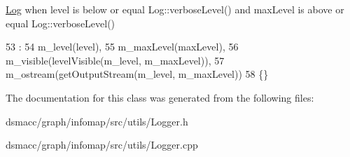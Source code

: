 \mbox{\hyperlink{classLog}{Log}} when level is below or equal Log\+::verbose\+Level() and max\+Level is above or equal Log\+::verbose\+Level() 
\begin{DoxyCode}
53                                                                                                        :
54         m\_level(level),
55         m\_maxLevel(maxLevel),
56         m\_visible(levelVisible(m\_level, m\_maxLevel)),
57         m\_ostream(getOutputStream(m\_level, m\_maxLevel))
58     \{\}
\end{DoxyCode}


The documentation for this class was generated from the following files\+:\begin{DoxyCompactItemize}
\item 
dsmacc/graph/infomap/src/utils/Logger.\+h\item 
dsmacc/graph/infomap/src/utils/Logger.\+cpp\end{DoxyCompactItemize}
